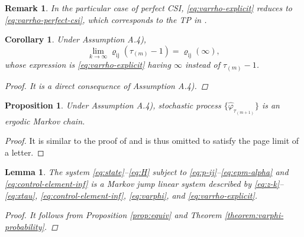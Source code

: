 \documentclass[journal,twoside,web]{ieeecolor}
\newtheorem{corollary}{Corollary}[theorem]
\newtheorem{remark}{Remark}
\newtheorem{lemma}{Lemma}
\newtheorem{proposition}{Proposition}
\begin{document}
\begin{remark}\label{rem:automatica-2}
    In the particular case of perfect CSI, \eqref{eq:varrho-explicit} reduces to \eqref{eq:varrho-perfect-csi}, which corresponds to the TP in \cite[Eq. (30)]{yZL-2025-automatica}.
\end{remark}

\begin{corollary}\label{corollary:varrho-inf}
    Under Assumption A.4), 
\begin{equation}
    \lim_{k\to \infty} \varrho_{\mathrm{i}\mathrm{j}}(\tau_{(m)}-1) = \varrho_{\mathrm{i}\mathrm{j}}(\infty),
\end{equation}
whose expression is \eqref{eq:varrho-explicit} having $\infty$ instead of $\tau_{(m)}-1$.

\begin{proof}
    It is a direct consequence of Assumption A.4).
\end{proof}
\end{corollary}

\begin{proposition}\label{prop:ergodicity}
	Under Assumption A.4), stochastic process $\{\hat{\varphi}_{\tau_{(m+1)}}\}$ is an ergodic Markov chain.
\end{proposition}
\begin{proof}
    It is similar to the proof of \cite[Prop. 15]{yZL-2025-automatica} and is thus omitted to satisfy the page limit of a letter. 
\end{proof}
\begin{lemma}\label{lemma:mjls-stability}
    The system \eqref{eq:state}--\eqref{eq:H} subject to \eqref{eq:p-ij}--\eqref{eq:epm-alpha} and \eqref{eq:control-element-inf} is a Markov jump linear system %
    described by \eqref{eq:z-k}--\eqref{eq:xtau}, \eqref{eq:control-element-inf}, \eqref{eq:varphi}, and \eqref{eq:varrho-explicit}.

\begin{proof}
    It follows from Proposition \ref{prop:equiv} %
    and Theorem \ref{theorem:varphi-probability}.
\end{proof}
\end{lemma}
\end{document}
